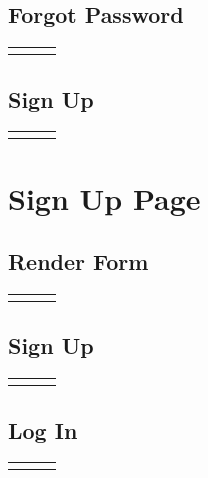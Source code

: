 \documentclass[12pt, letterpaper]{article}
\newcommand{\IPO}[3]{
  \begin{center}
    \begin{tabularx}{\linewidth}{XXX}
      \toprule
      \thead{Input} & \thead{Process} & \thead{Output} \\
      \midrule
      \RaggedRight{#1} & \RaggedRight{#2} & \RaggedRight{#3} \\
      \bottomrule
    \end{tabularx}
  \end{center}
}
\newcommand{\n}{\newline}
\begin{document}
\subsection{Forgot Password}

\IPO{``Forgot password'' link}{}{Go to forgot password page (\ref{forgot})}

\subsection{Sign Up}

\IPO{``Sign up'' link}{}{Go to sign up page (\ref{signup})}

\section{Sign Up Page}\label{signup}

\subsection{Render Form}

\IPO{}{Render first name input\n Render last name input\n Render email address input\n Render password input\n Render ``login'' link\n Render ``sign up'' button}{Form}

\subsection{Sign Up}

\IPO{\begin{enumerate}\item ``Sign up'' button\item First name (\texttt{string})\item Last name (\texttt{string})\item Email address (\texttt{string})\item Password (\texttt{string})\end{enumerate}}{Use the destructured \texttt{signUp} function within Redwood's \texttt{useAuth} React hook\n~\n Save session in browser's cookies, so user is immediately logged in}{Go to the page the user was previously on}

\subsection{Log In}

\IPO{``Log in'' link}{}{Go to login page (\ref{login})}
\end{document}
